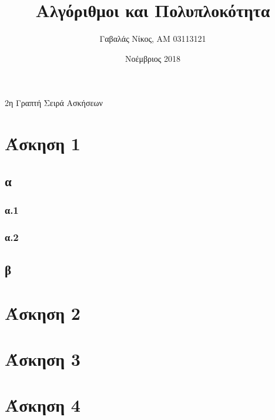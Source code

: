 \documentclass[12pt,a4paper]{article}
\title{Αλγόριθμοι και Πολυπλοκότητα}
\author{Γαβαλάς Νίκος, AM 03113121}
\date{Νοέμβριος 2018}
\begin{document}

  \begin{center}
    \Large{2η Γραπτή Σειρά Ασκήσεων}
  \end{center}

  \section{Άσκηση 1}

  \subsection{α}
  
  \subsubsection{α.1}

  \subsubsection{α.2}

  \subsection{β}
  
  \section{Άσκηση 2}
  
  \section{Άσκηση 3}
  
  \section{Άσκηση 4}
  
\end{document}
